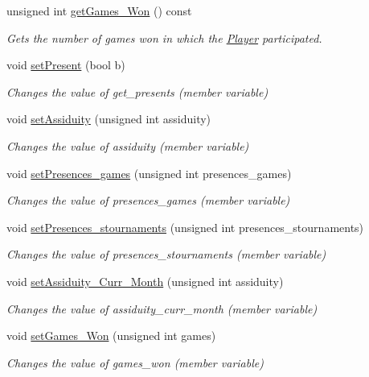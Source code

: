 \begin{DoxyCompactItemize}
unsigned int \hyperlink{class_player_a0a7205a9a0a7b9b6bf02035ee104b690}{get\+Games\+\_\+\+Won} () const
\begin{DoxyCompactList}\small\item\em Gets the number of games won in which the \hyperlink{class_player}{Player} participated. \end{DoxyCompactList}\item 
void \hyperlink{class_player_af7e72bf68786fafad86906bf4228c467}{set\+Present} (bool b)
\begin{DoxyCompactList}\small\item\em Changes the value of get\+\_\+presents (member variable) \end{DoxyCompactList}\item 
void \hyperlink{class_player_a7e5ebb8fa4bc30bf04bad367a195864b}{set\+Assiduity} (unsigned int assiduity)
\begin{DoxyCompactList}\small\item\em Changes the value of assiduity (member variable) \end{DoxyCompactList}\item 
void \hyperlink{class_player_a6e7482dfac54ccf8c7804dd909b70143}{set\+Presences\+\_\+games} (unsigned int presences\+\_\+games)
\begin{DoxyCompactList}\small\item\em Changes the value of presences\+\_\+games (member variable) \end{DoxyCompactList}\item 
void \hyperlink{class_player_a95c04115cff22ff76782c475f288561d}{set\+Presences\+\_\+stournaments} (unsigned int presences\+\_\+stournaments)
\begin{DoxyCompactList}\small\item\em Changes the value of presences\+\_\+stournaments (member variable) \end{DoxyCompactList}\item 
void \hyperlink{class_player_a705ed15f41e065c7b03ad4ad1cb5ab91}{set\+Assiduity\+\_\+\+Curr\+\_\+\+Month} (unsigned int assiduity)
\begin{DoxyCompactList}\small\item\em Changes the value of assiduity\+\_\+curr\+\_\+month (member variable) \end{DoxyCompactList}\item 
void \hyperlink{class_player_a2ff08de789327f4b3aa82f15b354ee4e}{set\+Games\+\_\+\+Won} (unsigned int games)
\begin{DoxyCompactList}\small\item\em Changes the value of games\+\_\+won (member variable) \end{DoxyCompactList}\item 

\end{DoxyCompactItemize}
